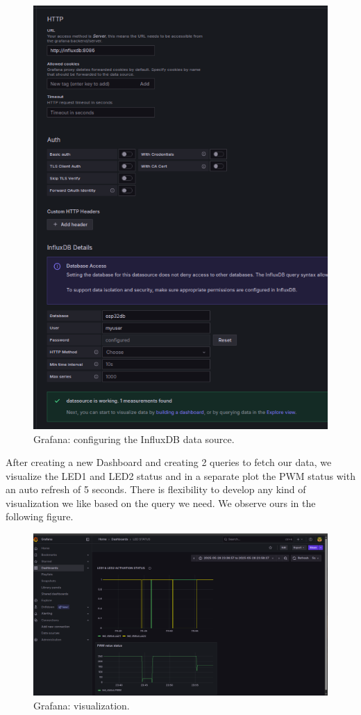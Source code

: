 \documentclass[a4paper,12pt]{article}
\begin{document}
		\begin{figure}[H]
			\centering
			\includegraphics[width=1\textwidth]{graf1.png}
			\caption{Grafana: configuring the InfluxDB data source.}
			\label{fig1:}
		\end{figure}		


After creating a new Dashboard and creating 2 queries to fetch our data, we visualize the LED1 and LED2 status and in a separate plot
the PWM status with an auto refresh of 5 seconds. There is flexibility to develop any kind of visualization we like based on the query we need.
We observe ours in the following figure.

		\begin{figure}[H]
			\centering
			\includegraphics[width=1\textwidth]{graf2.png}
			\caption{Grafana: visualization.}
			\label{fig1:}
		\end{figure}		
\end{document}
